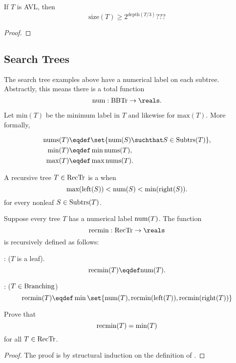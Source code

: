 \begin{lemma}\label{}
If $T$ is AVL, then
\[
\text{size}(T) \geq 2^{\text{depth}(T/3)}???
\]

\begin{proof}
\end{proof}
\end{lemma}

\subsection{Search Trees}

The search tree examples above have a numerical label on each subtree.
Abstractly, this means there is a total function
\[
\nlbl{}:\brnch \to \reals.
\]

Let $\text{min}(T)$ be the minimum label in $T$ and likewise for
$\text{max}(T)$.  More formally,
\begin{definition}
\begin{align}
\text{nums}(T) & \eqdef \set{\nlbl{(S)} \suchthat S \in \subbrn{T}},\\
\text{min}(T) &\eqdef \min \text{nums}(T), \label{defminT}\\
\text{max}(T) &\eqdef \max \text{nums}(T).\label{defmaxT}
\end{align}
\end{definition}

\begin{definition}\label{defsearchtree}
A recursive tree $T \in \text{RecTr}$ is a  when
\begin{equation}\label{}
\text{max}(\text{left}(S)) < \text{num}(S) < \text{min}(\text{right}(S)).
\end{equation}
for every nonleaf $S \in \text{Subtrs}(T)$.
\end{definition}

\begin{problem}
Suppose every tree $T$ has a numerical label $\text{num}(T)$. The function
\[
\rmin{}: \rectr \to \reals
\]
is recursively defined as follows:

: ($T$ is a leaf).
\[
\rmin{(T)} \eqdef \nlbl{(T)}.
\]

: ($T \in \text{Branching}$)
\[
\rmin{(T)} \eqdef \min\set{\nlbl{(T)}, \rmin{(\leftsub{(T)})}, \rmin{(\rightsub{(T)})}}
\]

Prove that
\[
\text{recmin}(T) = \text{min}(T)
\]
for all $T \in \text{RecTr}$.
\begin{solution}

\begin{proof}
The proof is by structural induction on the definition of \rmin{}.
\end{proof}

\end{solution}

\end{problem}


